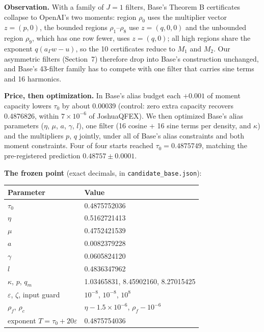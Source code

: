 \documentclass[11pt]{article}
\newcommand{\eps}{\varepsilon}
\theoremstyle{plain}
\begin{document}
\textbf{Observation.} With a family of $J = 1$ filters, Base's Theorem B certificates collapse to OpenAI's two moments: region $\rho_0$ uses the multiplier vector $z = (p, 0)$, the bounded regions $\rho_1$--$\rho_8$ use $z = (q, 0, 0)$ and the unbounded region $\rho_9$, which has one row fewer, uses $z = (q, 0)$; all high regions share the exponent $q(a_\Gamma w - u)$, so the 10 certificates reduce to $M_1$ and $M_2$. Our asymmetric filters (Section~7) therefore drop into Base's construction unchanged, and Base's 43-filter family has to compete with one filter that carries sine terms and 16 harmonics.

\textbf{Price, then optimization.} In Base's alias budget each $+0.001$ of moment capacity lowers $\tau_0$ by about 0.00039 (control: zero extra capacity recovers 0.4876826, within $7\times10^{-6}$ of JoshuaQFEX). We then optimized Base's alias parameters ($\eta$, $\mu$, $a$, $\gamma$, $l$), one filter (16 cosine + 16 sine terms per density, and $\kappa$) and the multipliers $p$, $q$ jointly, under all of Base's alias constraints and both moment constraints. Four of four starts reached $\tau_0 = 0.4875749$, matching the pre-registered prediction $0.48757 \pm 0.0001$.

\textbf{The frozen point} (exact decimals, in \texttt{candidate\_base.json}):

\begin{center}
\small
\begin{tabular}{ll}
\toprule
Parameter & Value \\
\midrule
$\tau_0$ & 0.4875752036 \\
$\eta$ & 0.5162721413 \\
$\mu$ & 0.4752421539 \\
$a$ & 0.0082379228 \\
$\gamma$ & 0.0605824120 \\
$l$ & 0.4836347962 \\
$\kappa$, $p$, $q_m$ & 1.03465831, 8.45902160, 8.27015425 \\
$\eps$, $\zeta$, input guard & $10^{-8}$, $10^{-8}$, $10^{8}$ \\
$\rho_f$, $\rho_c$ & $\eta - 1.5\times10^{-6}$, $\rho_f - 10^{-6}$ \\
exponent $T = \tau_0 + 20\eps$ & 0.4875754036 \\
\bottomrule
\end{tabular}
\end{center}
\end{document}
